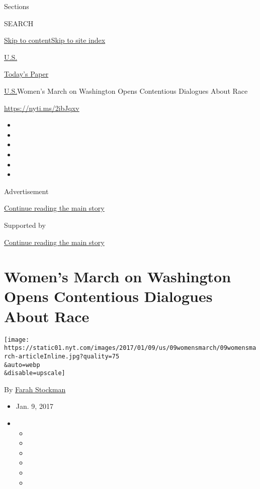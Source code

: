 Sections

SEARCH

\protect\hyperlink{site-content}{Skip to
content}\protect\hyperlink{site-index}{Skip to site index}

\href{https://www.nytimes.com/section/us}{U.S.}

\href{https://myaccount.nytimes.com/auth/login?response_type=cookie\&client_id=vi}{}

\href{https://www.nytimes.com/section/todayspaper}{Today's Paper}

\href{/section/us}{U.S.}\textbar{}Women's March on Washington Opens
Contentious Dialogues About Race

\url{https://nyti.ms/2ibJqxv}

\begin{itemize}
\item
\item
\item
\item
\item
\item
\end{itemize}

Advertisement

\protect\hyperlink{after-top}{Continue reading the main story}

Supported by

\protect\hyperlink{after-sponsor}{Continue reading the main story}

\hypertarget{womens-march-on-washington-opens-contentious-dialogues-about-race}{%
\section{Women's March on Washington Opens Contentious Dialogues About
Race}\label{womens-march-on-washington-opens-contentious-dialogues-about-race}}

\texttt{[image: https://static01.nyt.com/images/2017/01/09/us/09womensmarch/09womensmarch-articleInline.jpg?quality=75\\\&auto=webp\\\&disable=upscale]}

By \href{https://www.nytimes.com/by/farah-stockman}{Farah Stockman}

\begin{itemize}
\item
  Jan. 9, 2017
\item
  \begin{itemize}
  \item
  \item
  \item
  \item
  \item
  \item
  \end{itemize}
\end{itemize}

